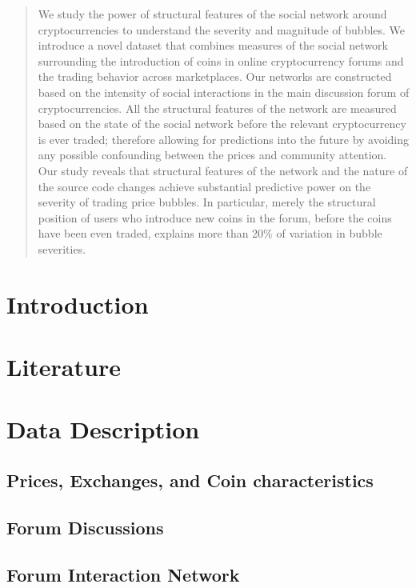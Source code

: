 \documentclass[letterpaper]{article}
\begin{document}
\begin{abstract}

We study the power of structural features of the social network around cryptocurrencies to understand the severity and magnitude of bubbles. 
We introduce a novel dataset that combines measures of the social network surrounding the introduction of coins in online cryptocurrency forums and the trading  behavior across marketplaces.
Our networks are constructed based on the intensity of social interactions in the main discussion forum of cryptocurrencies. All the structural features of the network are measured based on the state of the social network before the relevant cryptocurrency is ever traded; therefore allowing for predictions into the future by avoiding any possible confounding between the prices and community attention.
Our study reveals that structural features of the network and the nature of the source code changes achieve substantial predictive power on the severity of trading price bubbles. In particular, merely the structural position of users who introduce new coins in the forum, before the coins have been even traded,  explains  more than 20\% of variation in bubble severities.

\end{abstract}

\section{Introduction}

\section{Literature}


\section{Data Description}
\subsection{Prices, Exchanges, and Coin characteristics} \label{data_nikete}



\subsection{Forum Discussions}


\subsection{Forum Interaction Network}

\end{document}
